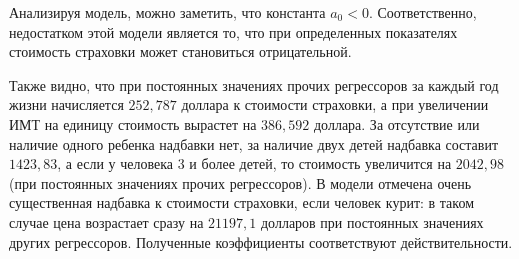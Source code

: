 \documentclass[a4paper,12pt]{article}
\begin{document}
Анализируя модель, можно заметить, что константа $a_0 < 0$. Соответственно, недостатком этой модели является то, что при определенных показателях стоимость страховки может становиться отрицательной.

Также видно, что при постоянных значениях прочих регрессоров за каждый год жизни начисляется $252,787$ доллара к стоимости страховки, а при увеличении ИМТ на единицу стоимость вырастет на $386,592$ доллара. За отсутствие или наличие одного ребенка надбавки нет, за наличие двух детей надбавка составит $1423,83$, а если у человека 3 и более детей, то стоимость увеличится на $2042,98$ (при постоянных значениях прочих регрессоров). В модели отмечена очень существенная надбавка к стоимости страховки, если человек курит: в таком случае цена возрастает сразу на $21197,1$ долларов при постоянных значениях других регрессоров. Полученные коэффициенты соответствуют действительности.
\end{document}
